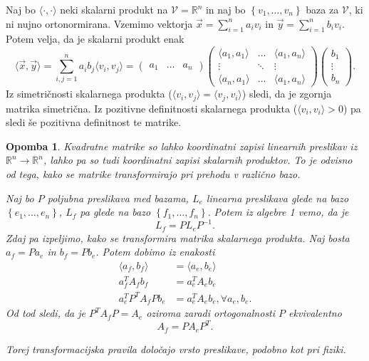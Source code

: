 \documentclass[10pt, a4paper]{article}
\newtheorem*{opomba}{Opomba}
\begin{document}
Naj bo $\langle \cdot , \cdot  \rangle $  neki skalarni
produkt na $\mathcal{V} = \mathbb{R}^n$ in naj bo $\left\{
v_1, \ldots , v_{n} \right\}$  baza za $\mathcal{V}$, ki ni
nujno ortonormirana. Vzemimo vektorja $\vec{x}  =
\sum_{i=1}^{n} a_{i}v_{i}$ in $\vec{y}  = \sum_{i=1}^{n}
b_{i}v_{i}.$ Potem velja, da je skalarni produkt enak \[
\langle \vec{x} , \vec{y} \rangle = \sum_{i,j = 1}^{n}
a_{i}b_{j}\langle v_{i}, v_{j} \rangle =
\begin{pmatrix}
a_1 & \ldots & a_n
\end{pmatrix}
\begin{pmatrix}
\langle a_1, a_1 \rangle & \dots & \langle a_1, a_n
\rangle \\ \vdots & \ddots & \vdots \\ \langle a_n,
a_1 \rangle & \dots & \langle a_1,a_n \rangle
\end{pmatrix}
\begin{pmatrix} b_1 \\ \vdots \\ b_n
\end{pmatrix}. \]
Iz simetričnosti skalarnega produkta
($\langle v_{i}, v_{j} \rangle  = \langle v_{j},  v_{i}
\rangle $) sledi, da je zgornja matrika simetrična. Iz
pozitivne definitnosti skalarnega produkta ($\langle
v_{i}, v_{i} \rangle > 0$) pa sledi še pozitivna 
definitnost te matrike. 

\begin{opomba}
Kvadratne matrike so lahko koordinatni
zapisi linearnih preslikav iz $\mathbb{R}^n \to
\mathbb{R}^n$, lahko pa so tudi koordinatni zapisi
skalarnih produktov. To je odvisno od tega, kako se
matrike transformirajo pri prehodu v različno bazo.

Naj bo $P$ poljubna preslikava med bazama, $L_e$
linearna preslikava glede na bazo $\left\{ e_1, \ldots
, e_{n}\right\}$, $L_f$ pa glede na bazo $\left\{ f_1,
\ldots, f_{n}\right\}.$ Potem iz algebre 1 vemo, da je \[
L_f = PL_eP^{-1}. \]Zdaj pa izpeljimo, kako se
transformira matrika skalarnega produkta. Naj bosta
$a_f = Pa_e$ in $b_f = Pb_e$. Potem dobimo iz enakosti
\begin{align*} \langle a_f, b_f \rangle &= \langle
a_e, b_e \rangle \\ a_f^{T} A_f b_f &= a_e^{T} A_e
b_e \\ a_e^{T} P^{T} A_f P b_e &= a_e^{T} A_e b_e,
\forall a_e, b_e. \end{align*} Od tod sledi, da je
$P^{T}A_fP = A_e$ oziroma zaradi ortogonalnosti
$P$ ekvivalentno \[A_f = PA_eP^{T}.\]

Torej transformacijska pravila določajo vrsto
preslikave, podobno kot pri fiziki. 
\end{opomba}
\end{document}
